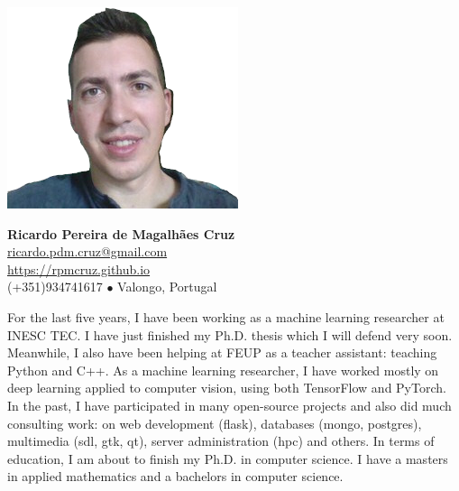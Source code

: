 \documentclass[10pt]{article}
\begin{document}
\begin{minipage}{0.12\linewidth}
\includegraphics[width=\linewidth]{imgs/photo}
\end{minipage}
\begin{minipage}{0.88\linewidth}
\textbf{\large Ricardo Pereira de Magalhães Cruz}\\
 \href{mailto:ricardo.pdm.cruz@gmail.com}{ricardo.pdm.cruz@gmail.com}\\
 \href{https://rpmcruz.github.io}{https://rpmcruz.github.io}\\
(+351)934741617 $\bullet$ Valongo, Portugal
\end{minipage}

\bigskip
\textcolor{black!80}{\colorbox{black!10}{\begin{minipage}{\linewidth}
For the last five years, I have been working as a machine learning researcher at INESC TEC. I have just finished my Ph.D. thesis which I will defend very soon. Meanwhile, I also have been helping at FEUP as a teacher assistant: teaching Python and C++.
As a machine learning researcher, I have worked mostly on deep learning applied to computer vision, using both TensorFlow and PyTorch. In the past, I have participated in many open-source projects and also did much consulting work: on web development (flask), databases (mongo, postgres), multimedia (sdl, gtk, qt), server administration (hpc) and others.
In terms of education, I am about to finish my Ph.D. in computer science. I have a masters in applied mathematics and a bachelors in computer science.
\end{minipage}}}
\end{document}
